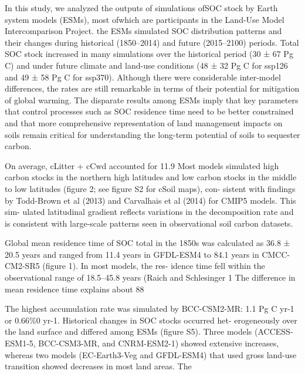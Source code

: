 \documentclass{article}
\begin{document}
\citep{Ito2019}
In this study, we analyzed the outputs of simulations ofSOC stock by Earth system models (ESMs), most ofwhich are participants in the Land-Use Model Intercomparison Project. the ESMs simulated SOC distribution patterns and their changes during historical (1850–2014) and future (2015–2100) periods. Total SOC stock increased in many simulations over the historical period (30 ± 67 Pg C) and under future climate and land-use conditions (48 ± 32 Pg C for ssp126 and 49 ± 58 Pg C for ssp370). Although there were considerable inter-model differences, the rates are still remarkable in terms of their potential for mitigation of global warming. The disparate results among ESMs imply that key parameters that control processes such as SOC residence time need to be better constrained and that more comprehensive representation of land management impacts on soils remain critical for understanding the long-term potential of soils to sequester carbon.

On average, cLitter + cCwd accounted for 11.9%
Most models simulated high carbon stocks in the northern high latitudes and low carbon stocks in the middle to low latitudes (figure 2; see figure S2 for cSoil maps), con- sistent with findings by Todd-Brown et al (2013) and Carvalhais et al (2014) for CMIP5 models. This sim- ulated latitudinal gradient reflects variations in the decomposition rate and is consistent with large-scale patterns seen in observational soil carbon datasets.

Global mean residence time of SOC total in the
1850s was calculated as 36.8 ± 20.5 years and ranged from 11.4 years in GFDL-ESM4 to 84.1 years in CMCC-CM2-SR5 (figure 1). In most models, the res- idence time fell within the observational range of 18.5–45.8 years (Raich and Schlesinger 1
The difference in mean residence time explains about 88%

The highest accumulation rate was simulated by BCC-CSM2-MR: 1.1 Pg C yr-1 or 0.66\%0 yr-1. Historical changes in SOC stocks occurred het-
erogeneously over the land surface and differed among ESMs (figure S5). Three models (ACCESS- ESM1-5, BCC-CSM3-MR, and CNRM-ESM2-1) showed extensive increases, whereas two models (EC-Earth3-Veg and GFDL-ESM4) that used gross land-use transition showed decreases in most land areas. The
\end{document}
